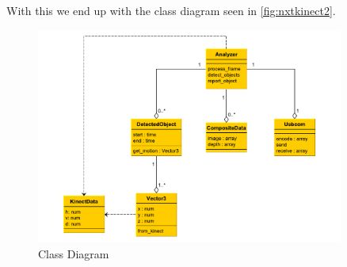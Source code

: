With this we end up with the class diagram seen in \autoref{fig:nxtkinect2}.

\begin{figure}[hbtp]
\includegraphics[width=0.90\textwidth]{img/nxtkinect2.pdf}
\caption{Class Diagram} 
\label{fig:nxtkinect2} 
\end{figure}


